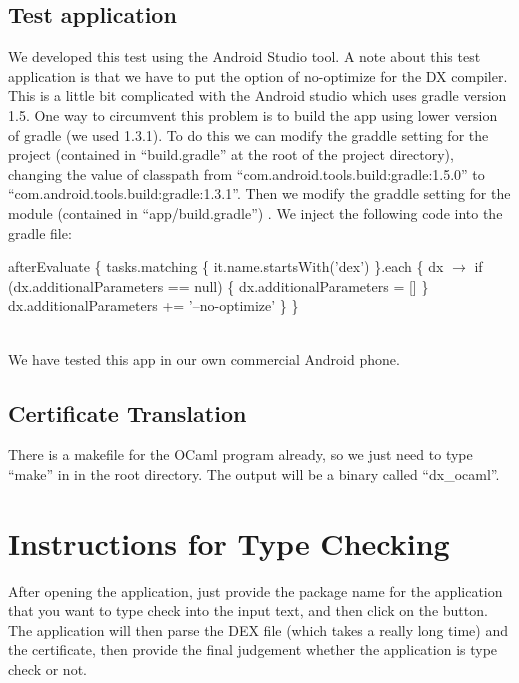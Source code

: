 \documentclass[a4]{article}
\begin{document}
\subsection{Test application}
We developed this test using the Android Studio tool. 
A note about this test application is that we have to put the option of no-optimize for
the DX compiler. This is a little bit complicated with the Android studio which uses
gradle version 1.5. One way to circumvent this problem is to build the app using
lower version of gradle (we used 1.3.1). To do this we can modify the graddle setting
for the project (contained in ``build.gradle'' at the root of the project directory), 
changing the value of classpath from ``com.android.tools.build:gradle:1.5.0'' to 
``com.android.tools.build:gradle:1.3.1''.
Then we modify the graddle setting for the module (contained in ``app/build.gradle'') .
We inject the following code into the gradle file:
\begin{algorithm}
\begin{algorithmic}
\STATE afterEvaluate \{
\STATE \hspace{0.5cm}tasks.matching \{ it.name.startsWith('dex') \}.each \{ dx $\rightarrow$
\STATE \hspace{0.5cm}if (dx.additionalParameters == null) \{ dx.additionalParameters = [] \}
\STATE \hspace{0.5cm}dx.additionalParameters += '--no-optimize' \}
\STATE \}
\end{algorithmic}
\end{algorithm}\\
We have tested this app in our own commercial Android phone. 

\subsection{Certificate Translation}
There is a makefile for the OCaml program already, so we just need to type ``make'' in
in the root directory. The output will be a binary called ``dx\_ocaml''.

\section{Instructions for Type Checking}
After opening the application, just provide the package name for the application that
you want to type check into the input text, and then click on the button. The application
will then parse the DEX file (which takes a really long time) and the certificate, then
provide the final judgement whether the application is type check or not.
\end{document}
